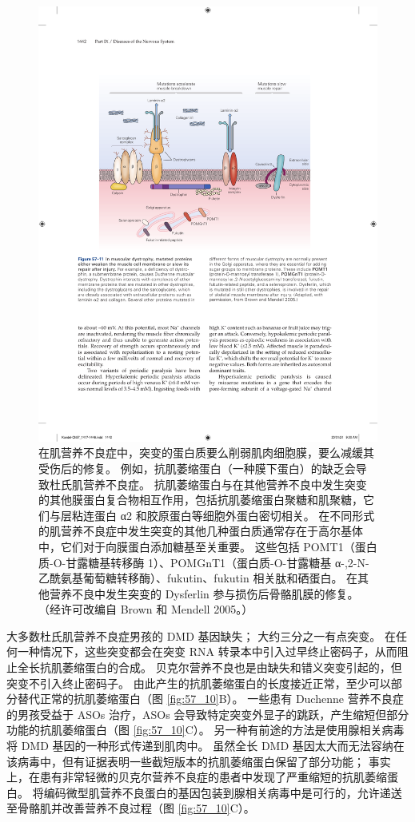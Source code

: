 \begin{figure}[htbp]
	\centering
	\includegraphics[width=0.8\linewidth]{chap57/fig_57_11}
	\caption{在肌营养不良症中，突变的蛋白质要么削弱肌肉细胞膜，要么减缓其受伤后的修复。 例如，抗肌萎缩蛋白（一种膜下蛋白）的缺乏会导致杜氏肌营养不良症。 抗肌萎缩蛋白与在其他营养不良中发生突变的其他膜蛋白复合物相互作用，包括抗肌萎缩蛋白聚糖和肌聚糖，它们与层粘连蛋白 α2 和胶原蛋白等细胞外蛋白密切相关。 在不同形式的肌营养不良症中发生突变的其他几种蛋白质通常存在于高尔基体中，它们对于向膜蛋白添加糖基至关重要。 这些包括 POMT1（蛋白质-O-甘露糖基转移酶 1）、POMGnT1（蛋白质-O-甘露糖基 α-,2-N-乙酰氨基葡萄糖转移酶）、fukutin、fukutin 相关肽和硒蛋白。 在其他营养不良中发生突变的 Dysferlin 参与损伤后骨骼肌膜的修复。 （经许可改编自 Brown 和 Mendell 2005。）}
	\label{fig:57_11}
\end{figure}


大多数杜氏肌营养不良症男孩的 DMD 基因缺失；
大约三分之一有点突变。
在任何一种情况下，这些突变都会在突变 RNA 转录本中引入过早终止密码子，从而阻止全长抗肌萎缩蛋白的合成。
贝克尔营养不良也是由缺失和错义突变引起的，但突变不引入终止密码子。
由此产生的抗肌萎缩蛋白的长度接近正常，至少可以部分替代正常的抗肌萎缩蛋白（图 \ref{fig:57_10}B）。
一些患有 Duchenne 营养不良症的男孩受益于 ASOs 治疗，ASOs 会导致特定突变外显子的跳跃，产生缩短但部分功能的抗肌萎缩蛋白（图 \ref{fig:57_10}C）。
另一种有前途的方法是使用腺相关病毒将 DMD 基因的一种形式传递到肌肉中。
虽然全长 DMD 基因太大而无法容纳在该病毒中，但有证据表明一些截短版本的抗肌萎缩蛋白保留了部分功能；
事实上，在患有非常轻微的贝克尔营养不良症的患者中发现了严重缩短的抗肌萎缩蛋白。
将编码微型肌营养不良蛋白的基因包装到腺相关病毒中是可行的，允许递送至骨骼肌并改善营养不良过程（图 \ref{fig:57_10}C）。


